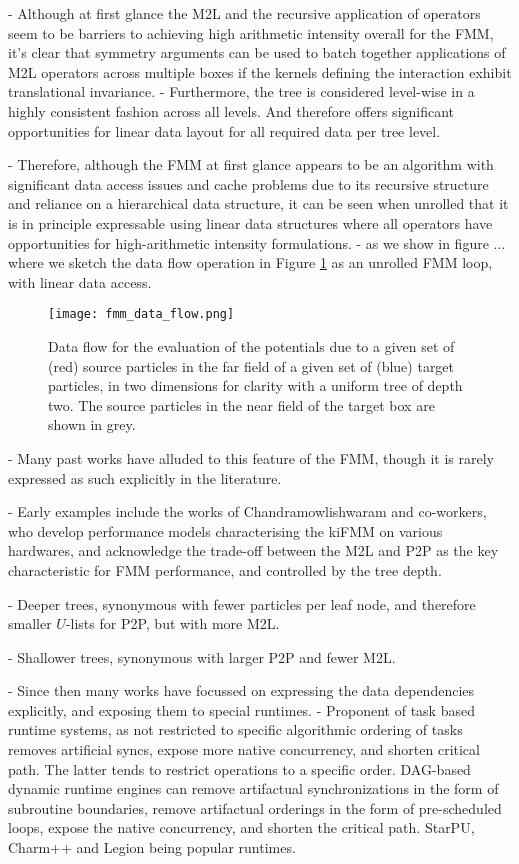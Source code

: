 - Although at first glance the M2L and the recursive application of operators seem to be barriers to achieving high arithmetic intensity overall for the FMM, it's clear that symmetry arguments can be used to batch together applications of M2L operators across multiple boxes if the kernels defining the interaction exhibit translational invariance.
- Furthermore, the tree is considered level-wise in a highly consistent fashion across all levels. And therefore offers significant opportunities for linear data layout for all required data per tree level.

- Therefore, although the FMM at first glance appears to be an algorithm with significant data access issues and cache problems due to its recursive structure and reliance on a hierarchical data structure, it can be seen when unrolled that it is in principle expressable using linear data structures where all operators have opportunities for high-arithmetic intensity formulations.
- as we show in figure ... where we sketch the data flow operation in Figure \ref{fig:chpt:fmm:data_flow} as an unrolled FMM loop, with linear data access.

\begin{figure}[h]
    \texttt{[image: fmm\_data\_flow.png]}
    \caption{Data flow for the evaluation of the potentials due to a given set of (red) source particles in the far field of a given set of (blue) target particles, in two dimensions for clarity with a uniform tree of depth two. The source particles in the near field of the target box are shown in grey.}
    \label{fig:chpt:fmm:data_flow}
\end{figure}

- Many past works have alluded to this feature of the FMM, though it is rarely expressed as such explicitly in the literature.

- Early examples include the works of Chandramowlishwaram and co-workers, who develop performance models characterising the kiFMM on various hardwares, and acknowledge the trade-off between the M2L and P2P as the key characteristic for FMM performance, and controlled by the tree depth.

- Deeper trees, synonymous with fewer particles per leaf node, and therefore smaller $U$-lists for P2P, but with more M2L.

- Shallower trees, synonymous with larger P2P and fewer M2L.

- Since then many works have focussed on expressing the data dependencies explicitly, and exposing them to special runtimes. - Proponent of task based runtime systems, as not restricted to specific algorithmic ordering of tasks removes artificial syncs, expose more native concurrency, and shorten critical path. The latter tends to restrict operations to a specific order. DAG-based dynamic runtime engines can remove artifactual synchronizations in the form of subroutine boundaries, remove artifactual orderings in the form of pre-scheduled loops, expose the native concurrency, and shorten the critical path. StarPU, Charm++ and Legion being popular runtimes.

